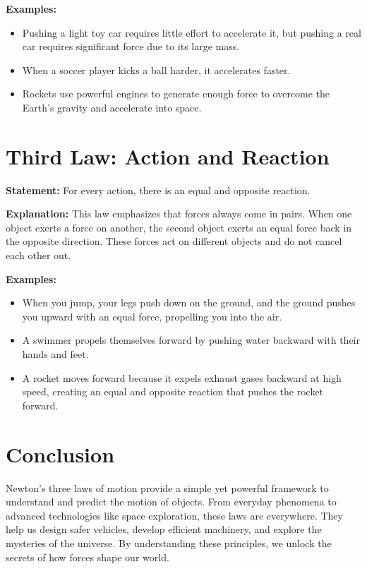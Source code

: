 \documentclass[12pt]{article}
\begin{document}
\textbf{Examples:}
\begin{itemize}
    \item Pushing a light toy car requires little effort to accelerate it, but pushing a real car requires significant force due to its large mass.
    \item When a soccer player kicks a ball harder, it accelerates faster.
    \item Rockets use powerful engines to generate enough force to overcome the Earth's gravity and accelerate into space.
\end{itemize}

\section*{Third Law: Action and Reaction}
\textbf{Statement:} For every action, there is an equal and opposite reaction.

\textbf{Explanation:} This law emphasizes that forces always come in pairs. When one object exerts a force on another, the second object exerts an equal force back in the opposite direction. These forces act on different objects and do not cancel each other out.

\textbf{Examples:}
\begin{itemize}
    \item When you jump, your legs push down on the ground, and the ground pushes you upward with an equal force, propelling you into the air.
    \item A swimmer propels themselves forward by pushing water backward with their hands and feet.
    \item A rocket moves forward because it expels exhaust gases backward at high speed, creating an equal and opposite reaction that pushes the rocket forward.
\end{itemize}

\section*{Conclusion}
Newton's three laws of motion provide a simple yet powerful framework to understand and predict the motion of objects. From everyday phenomena to advanced technologies like space exploration, these laws are everywhere. They help us design safer vehicles, develop efficient machinery, and explore the mysteries of the universe. By understanding these principles, we unlock the secrets of how forces shape our world.
\end{document}
